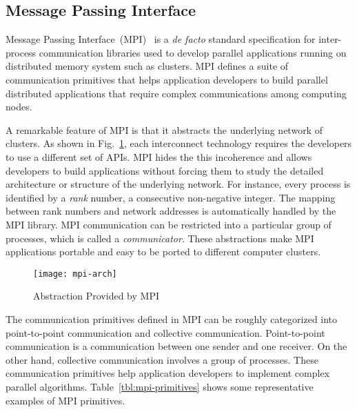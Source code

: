 \subsection{Message Passing Interface}\label{sec:i-mpi}

Message Passing Interface~(MPI)~\autocite{MessagePassingInterfaceForum2015} is a \emph{de
facto} standard specification for inter-process communication libraries
used to develop parallel applications running on distributed memory system
such as clusters. MPI defines a suite of communication primitives that helps
application developers to build parallel distributed applications that require
complex communications among computing nodes.

A remarkable feature of MPI is that it abstracts the underlying network
of clusters. As shown in Fig.~\ref{fig:mpi-arch}, each interconnect technology
requires the developers to use a different set of APIs. MPI hides the this
incoherence and allows developers to build applications without forcing them
to study the detailed architecture or structure of the underlying network. For
instance, every process is identified by a \emph{rank} number, a consecutive
non-negative integer. The mapping between rank numbers and network addresses
is automatically handled by the MPI library. MPI communication can be
restricted into a particular group of processes, which is called a
\emph{communicator}. These abstractions make MPI applications portable and
easy to be ported to different computer clusters.

\begin{figure}
    \centering
    \texttt{[image: mpi-arch]}
    \caption{Abstraction Provided by MPI}%
    \label{fig:mpi-arch}
\end{figure}

The communication primitives defined in MPI can be roughly categorized into
point-to-point communication and collective communication. Point-to-point
communication is a communication between one sender and one receiver. On the
other hand, collective communication involves a group of processes. These
communication primitives help application developers to implement complex
parallel algorithms. Table~\ref{tbl:mpi-primitives} shows some representative
examples of MPI primitives.

